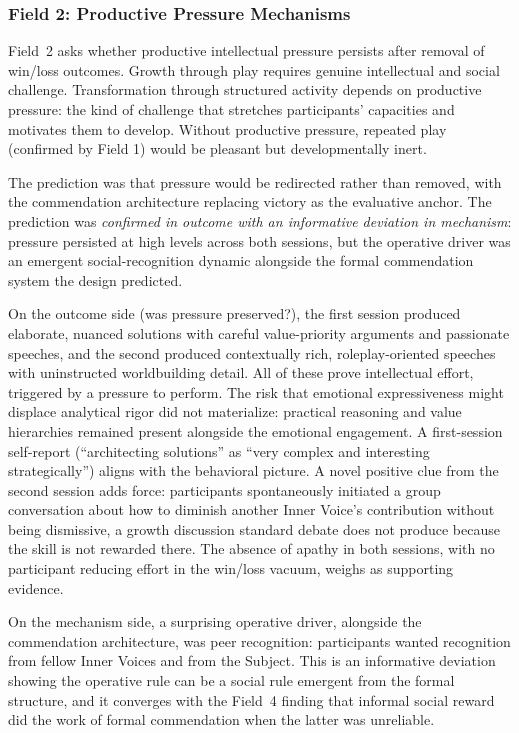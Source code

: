 \subsubsection{Field 2: Productive Pressure Mechanisms}

Field~2 asks whether productive intellectual pressure persists after removal of win/loss outcomes. Growth through play requires genuine intellectual and social challenge. Transformation through structured activity depends on productive pressure: the kind of challenge that stretches participants' capacities and motivates them to develop. Without productive pressure, repeated play (confirmed by Field 1) would be pleasant but developmentally inert.

The prediction was that pressure would be redirected rather than removed, with the commendation architecture replacing victory as the evaluative anchor. The prediction was \textit{confirmed in outcome with an informative deviation in mechanism}: pressure persisted at high levels across both sessions, but the operative driver was an emergent social-recognition dynamic alongside the formal commendation system the design predicted.

On the outcome side (was pressure preserved?), the first session produced elaborate, nuanced solutions with careful value-priority arguments and passionate speeches, and the second produced contextually rich, roleplay-oriented speeches with uninstructed worldbuilding detail. All of these prove intellectual effort, triggered by a pressure to perform. The risk that emotional expressiveness might displace analytical rigor did not materialize: practical reasoning and value hierarchies remained present alongside the emotional engagement. A first-session self-report (``architecting solutions'' as ``very complex and interesting strategically'') aligns with the behavioral picture. A novel positive clue from the second session adds force: participants spontaneously initiated a group conversation about how to diminish another Inner Voice's contribution without being dismissive, a growth discussion standard debate does not produce because the skill is not rewarded there. The absence of apathy in both sessions, with no participant reducing effort in the win/loss vacuum, weighs as supporting evidence.

On the mechanism side, a surprising operative driver, alongside the commendation architecture, was peer recognition: participants wanted recognition from fellow Inner Voices and from the Subject. This is an informative deviation showing the operative rule can be a social rule emergent from the formal structure, and it converges with the Field~4 finding that informal social reward did the work of formal commendation when the latter was unreliable.

